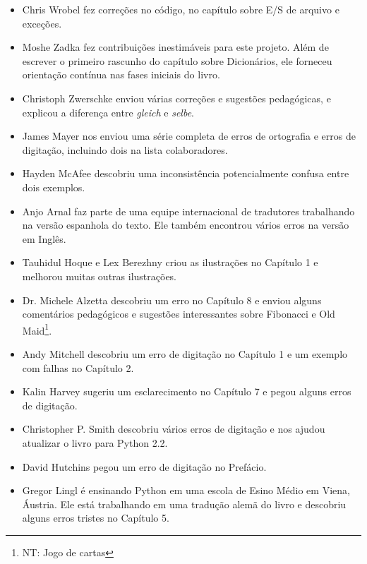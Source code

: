 \documentclass[10pt]{book}
\begin{document}
\begin {itemize}
\item Chris Wrobel fez correções no código, no capítulo sobre
E/S de arquivo e exceções. 

\item Moshe Zadka fez contribuições inestimáveis ​​para este projeto.
Além de escrever o primeiro rascunho do capítulo sobre Dicionários, ele
forneceu orientação contínua nas fases iniciais do livro.

\item Christoph Zwerschke enviou várias correções e
sugestões pedagógicas, e explicou a diferença entre {\em gleich}
e {\em selbe}.

\item James Mayer nos enviou uma série completa de erros de ortografia e
erros de digitação, incluindo dois na lista colaboradores.

\item Hayden McAfee descobriu uma inconsistência potencialmente confusa
entre dois exemplos.

\item Anjo Arnal faz parte de uma equipe internacional de tradutores
trabalhando na versão espanhola do texto. Ele também encontrou vários
erros na versão em Inglês.

\item Tauhidul Hoque e Lex Berezhny criou as ilustrações
no Capítulo 1 e melhorou muitas outras ilustrações.

\item Dr. Michele Alzetta descobriu um erro no Capítulo 8 e enviou
alguns comentários pedagógicos e sugestões interessantes sobre Fibonacci
e Old Maid\footnote{NT: Jogo de cartas}.

\item Andy Mitchell descobriu um erro de digitação no Capítulo 1 e um exemplo com falhas
no Capítulo 2.

\item Kalin Harvey sugeriu um esclarecimento no Capítulo 7 e
pegou alguns erros de digitação.

\item Christopher P. Smith descobriu vários erros de digitação e nos ajudou
atualizar o livro para Python 2.2.

\item David Hutchins pegou um erro de digitação no Prefácio.

\item Gregor Lingl é ensinando Python em uma escola de Esino Médio em Viena,
Áustria. Ele está trabalhando em uma tradução alemã do livro
e descobriu alguns erros tristes no Capítulo 5.


\end{itemize}
\end{document}
